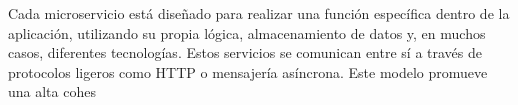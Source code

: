\documentclass{article}
\begin{document}
Cada microservicio está diseñado para realizar una función específica dentro de la aplicación, utilizando su propia lógica, almacenamiento de datos y, en muchos casos, diferentes tecnologías. Estos servicios se comunican entre sí a través de protocolos ligeros como HTTP o mensajería asíncrona. Este modelo promueve una alta cohes
\end{document}
